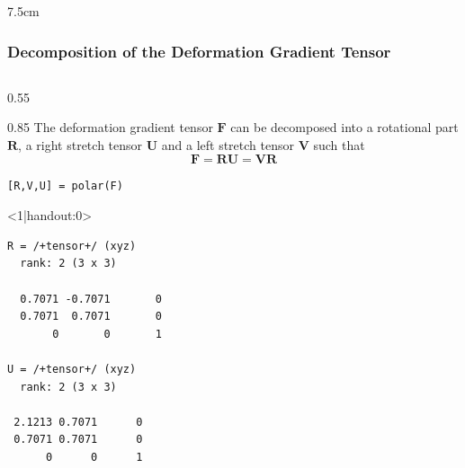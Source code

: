 \documentclass[compress,aspectratio=1610,fleqn]{beamer}
\begin{document}
\begin{frame}
\begin{overlayarea}{\textwidth}{7.5cm}






\end{overlayarea}
\end{frame}


\begin{frame}[fragile]
  \frametitle{Decomposition of the Deformation Gradient Tensor}

  \begin{columns}
    \begin{column}{0.55\textwidth}
      \begin{overlayarea}{\textwidth}{0.85\textheight}
        The deformation gradient tensor $\mathbf F$ can be decomposed into a
        rotational part $\mathbf R$, a right stretch tensor $\mathbf U$ and a
        left stretch tensor $\mathbf V$ such that
        \begin{equation*}
          \mathbf F = \mathbf R \mathbf U = \mathbf V \mathbf R
        \end{equation*}
\vspace{-0.8cm}
\begin{lstlisting}[style=input]
[R,V,U] = polar(F)
\end{lstlisting}
        \begin{onlyenv}<1|handout:0>
          \vspace{-0.3cm}
\begin{lstlisting}[style=output]
R = /+tensor+/ (xyz)
  rank: 2 (3 x 3)

  0.7071 -0.7071       0
  0.7071  0.7071       0
       0       0       1

U = /+tensor+/ (xyz)
  rank: 2 (3 x 3)

 2.1213 0.7071      0
 0.7071 0.7071      0
      0      0      1
\end{lstlisting}
        \end{onlyenv}

        \medskip
  \pause


\end{overlayarea}
\end{column}
\end{columns}
\end{frame}
\end{document}
